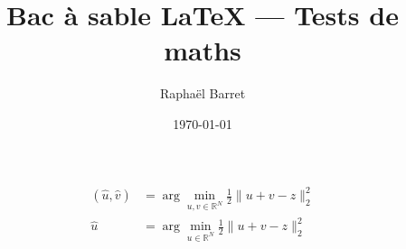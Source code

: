 \documentclass[11pt,a4paper]{article}
\title{Bac à sable LaTeX — Tests de maths}
\author{Raphaël Barret}
\date{\today}
\theoremstyle{definition}
\theoremstyle{remark}
\begin{document}
\maketitle

\begin{align}

(\hat{u},\hat{v}) 
&= \arg\min_{u,v \in \mathbb{R}^{N}} 
\frac{1}{2}\|u+v-z\|_{2}^{2} \\[6pt]
\hat{u} 
&= \arg\min_{u \in \mathbb{R}^{N}} 
\frac{1}{2}\|u+v-z\|_{2}^{2}\\

\end{align}
\end{document}
